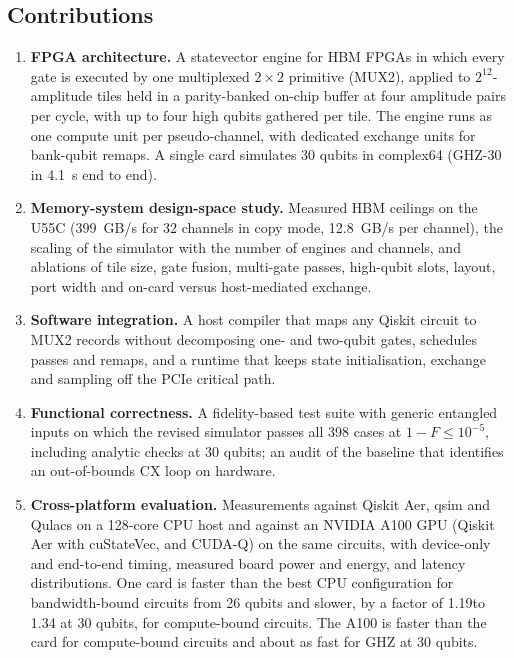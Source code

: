 \documentclass[pdflatex,sn-mathphys-num]{sn-jnl}
\newcommand{\NumFlagGhzThirtyEtoE}{4.1}
\newcommand{\NumHbmSixteenPerCURead}{12.8}
\newcommand{\NumHbmThirtytwoCopy}{399}
\newcommand{\NumSuiteTotal}{398}
\newcommand{\NumXplatCpuFasterOtherThirtyMax}{1.34}
\newcommand{\NumXplatCpuFasterOtherThirtyMin}{1.19}
\newcommand{\NumXplatGhzCrossN}{26}
\theoremstyle{thmstyleone}
\theoremstyle{thmstylethree}
\begin{document}
\subsection{Contributions}\label{subsec:contributions}

\begin{enumerate}
\item \textbf{FPGA architecture.} A statevector engine for HBM FPGAs in which every gate is executed by one multiplexed $2\times2$ primitive (MUX2), applied to $2^{12}$-amplitude tiles held in a parity-banked on-chip buffer at four amplitude pairs per cycle, with up to four high qubits gathered per tile. The engine runs as one compute unit per pseudo-channel, with dedicated exchange units for bank-qubit remaps. A single card simulates 30 qubits in complex64 (GHZ-30 in \NumFlagGhzThirtyEtoE~s end to end).
\item \textbf{Memory-system design-space study.} Measured HBM ceilings on the U55C (\NumHbmThirtytwoCopy~GB/s for 32 channels in copy mode, \NumHbmSixteenPerCURead~GB/s per channel), the scaling of the simulator with the number of engines and channels, and ablations of tile size, gate fusion, multi-gate passes, high-qubit slots, layout, port width and on-card versus host-mediated exchange.
\item \textbf{Software integration.} A host compiler that maps any Qiskit circuit to MUX2 records without decomposing one- and two-qubit gates, schedules passes and remaps, and a runtime that keeps state initialisation, exchange and sampling off the PCIe critical path.
\item \textbf{Functional correctness.} A fidelity-based test suite with generic entangled inputs on which the revised simulator passes all \NumSuiteTotal{} cases at $1-F\leq 10^{-5}$, including analytic checks at 30 qubits; an audit of the baseline that identifies an out-of-bounds CX loop on hardware.
\item \textbf{Cross-platform evaluation.} Measurements against Qiskit Aer, qsim and Qulacs on a 128-core CPU host and against an NVIDIA A100 GPU (Qiskit Aer with cuStateVec, and CUDA-Q) on the same circuits, with device-only and end-to-end timing, measured board power and energy, and latency distributions. One card is faster than the best CPU configuration for bandwidth-bound circuits from \NumXplatGhzCrossN{} qubits and slower, by a factor of \NumXplatCpuFasterOtherThirtyMin to \NumXplatCpuFasterOtherThirtyMax{} at 30 qubits, for compute-bound circuits. The A100 is faster than the card for compute-bound circuits and about as fast for GHZ at 30 qubits.
\end{enumerate}
\end{document}
